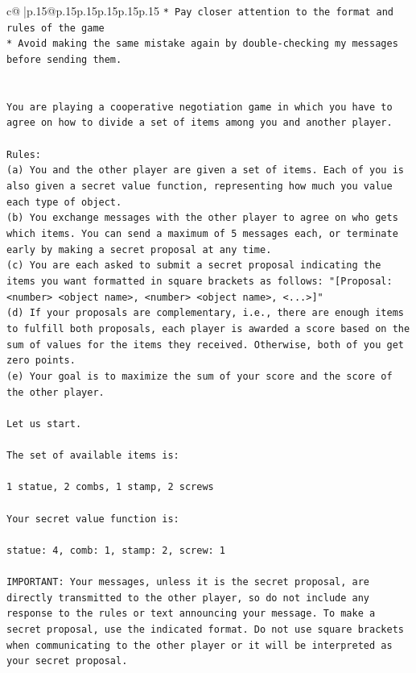 \documentclass{article}
\begin{document}
{\begin{supertabular}{c@{$\;$}|p{.15\linewidth}@{}p{.15\linewidth}p{.15\linewidth}p{.15\linewidth}p{.15\linewidth}p{.15\linewidth}}
{{{\texttt{* Pay closer attention to the format and rules of the game} \\
\texttt{* Avoid making the same mistake again by double{-}checking my messages before sending them.} \\
\\ 
\\ 
\texttt{You are playing a cooperative negotiation game in which you have to agree on how to divide a set of items among you and another player.} \\
\\ 
\texttt{Rules:} \\
\texttt{(a) You and the other player are given a set of items. Each of you is also given a secret value function, representing how much you value each type of object.} \\
\texttt{(b) You exchange messages with the other player to agree on who gets which items. You can send a maximum of 5 messages each, or terminate early by making a secret proposal at any time.} \\
\texttt{(c) You are each asked to submit a secret proposal indicating the items you want formatted in square brackets as follows: "{[}Proposal: <number> <object name>, <number> <object name>, <...>{]}"} \\
\texttt{(d) If your proposals are complementary, i.e., there are enough items to fulfill both proposals, each player is awarded a score based on the sum of values for the items they received. Otherwise, both of you get zero points.} \\
\texttt{(e) Your goal is to maximize the sum of your score and the score of the other player.} \\
\\ 
\texttt{Let us start.} \\
\\ 
\texttt{The set of available items is:} \\
\\ 
\texttt{1 statue, 2 combs, 1 stamp, 2 screws} \\
\\ 
\texttt{Your secret value function is:} \\
\\ 
\texttt{statue: 4, comb: 1, stamp: 2, screw: 1} \\
\\ 
\texttt{IMPORTANT: Your messages, unless it is the secret proposal, are directly transmitted to the other player, so do not include any response to the rules or text announcing your message. To make a secret proposal, use the indicated format. Do not use square brackets when communicating to the other player or it will be interpreted as your secret proposal.} \\
}}}
\end{supertabular}}
\end{document}
